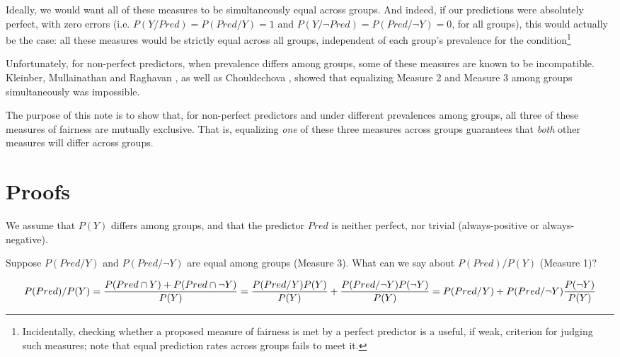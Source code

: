 \documentclass[twocolumn]{article}
\begin{document}
Ideally, we would want all of these measures to be simultaneously equal across
groups. And indeed, if our predictions were absolutely perfect, with zero
errors (i.e. $P(Y/Pred)=P(Pred/Y)=1$ and $P(Y/\neg Pred)=P(Pred/ \neg Y)=0$, for all groups),
this would actually be the case: all these measures would be strictly equal
across all groups, independent of each group's prevalence for the condition\footnote{Incidentally, checking whether a proposed measure of fairness is met by a perfect predictor is a useful, if weak, criterion for judging such measures; note that equal prediction rates across groups fails to meet it.}

Unfortunately, for non-perfect predictors, when prevalence differs among groups, some of these measures are known to be incompatible.  Kleinber, Mullainathan and Raghavan \cite{kleinberg2016inherent}, as well as Chouldechova \cite{chouldechova2017fair}, showed that equalizing Measure 2 and Measure 3 among groups simultaneously was impossible. 

The purpose of this note is to show that, for non-perfect
predictors and under different prevalences among groups, all three of these measures of
fairness are mutually exclusive. That is,
equalizing \emph{one} of these three measures across groups guarantees that
\emph{both} other measures will differ across groups.

\section{Proofs}


We assume that $P(Y)$ differs among groups, and that the predictor $Pred$ is neither perfect, nor trivial (always-positive or always-negative). 

Suppose $P(Pred/Y)$ and $P(Pred/\neg Y)$ are equal among groups (Measure 3). What can we say about $P(Pred)/P(Y)$ (Measure 1)?


\begin{dmath}
P(Pred)/P(Y) = \frac{P(Pred \cap Y) + P(Pred \cap \neg Y)}{P(Y)}\\ 
= \frac{P(Pred / Y) P(Y)}{P(Y)} + \frac{P(Pred / \neg Y) P(\neg Y)}{P(Y)} \\
= P(Pred / Y) + P(Pred / \neg Y) \frac{P(\neg Y)}{P(Y) \label{eq1}}
\end{dmath}
\end{document}
